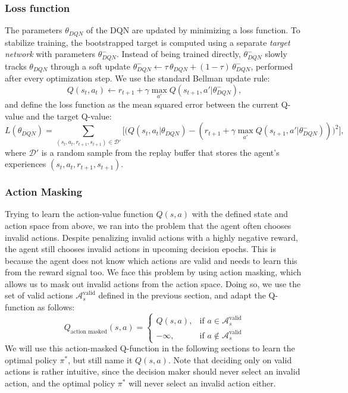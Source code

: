 \subsubsection{Loss function}
The parameters $\theta_{DQN}$ of the DQN are updated by minimizing a loss function. To stabilize training, the bootstrapped target is computed using a separate \emph{target network} with parameters $\theta_{DQN}^-$. Instead of being trained directly, $\theta_{DQN}^-$ slowly tracks $\theta_{DQN}$ through a soft update $\theta_{DQN}^- \leftarrow \tau\,\theta_{DQN} + (1-\tau)\,\theta_{DQN}^-$, performed after every optimization step. We use the standard Bellman update rule:
\[
  Q(s_t, a_t) \leftarrow r_{t+1} + \gamma \max_{a'} Q(s_{t+1}, a' \vert \theta_{DQN}^-),
\]
and define the loss function as the mean squared error between the current Q-value and the target Q-value:
\[
  L(\theta_{DQN}) = \sum_{(s_t, a_t, r_{t+1}, s_{t+1}) \in \mathcal{D'}} \Big[ \big( Q(s_t, a_t \vert \theta_{DQN}) - (r_{t+1} + \gamma \max_{a'} Q(s_{t+1}, a' \vert \theta_{DQN}^-)) \big)^2 \Big],
\]
where $\mathcal{D'}$ is a random sample from the replay buffer that stores the agent's experiences $(s_t, a_t, r_{t+1}, s_{t+1})$.
\subsubsection{Action Masking}
Trying to learn the action-value function $Q(s,a)$ with the defined state and action space from above,
we ran into the problem that the agent often chooses invalid actions. Despite penalizing invalid actions with a highly negative reward, the agent
still chooses invalid actions in upcoming decision epochs. This is because the agent does not know which actions are valid and needs to learn this from the reward signal too.
We face this problem by using action masking, which allows us to mask out invalid actions from the action space. Doing so, we use the set of valid actions $\mathcal{A}_s^{\text{valid}}$ defined in the previous section,
and adapt the Q-function as follows:
\[
  Q_{\text{action masked}}(s,a) = \begin{cases}
    Q(s,a), & \text{if } a \in \mathcal{A}_s^{\text{valid}} \\
    -\infty, & \text{if } a \notin \mathcal{A}_s^{\text{valid}}
  \end{cases}
\]
We will use this action-masked Q-function in the following sections to learn the optimal policy $\pi^*$, but still name it $Q(s,a)$.
Note that deciding only on valid actions is rather intuitive, since the decision maker should never select an invalid action, and the optimal policy $\pi^*$ will never select an invalid action either.
